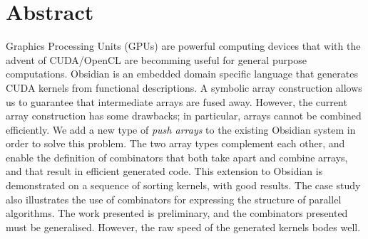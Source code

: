 

\section*{Abstract}
Graphics Processing Units (GPUs) are powerful computing devices 
that with the advent of CUDA/OpenCL are becomming useful for general 
purpose computations. 
Obsidian is an embedded domain specific language that generates CUDA kernels
from functional descriptions.
A symbolic array construction allows us to guarantee that intermediate
arrays are fused away. However, the current array construction has
some drawbacks; in particular, arrays cannot be combined efficiently.
We add a new type of {\em push arrays} to the existing Obsidian system in 
order to solve this problem. The two array types complement each other,
and enable the definition of combinators that both
take apart and combine arrays, and that result in efficient generated code.
This extension to Obsidian is demonstrated on a sequence of
sorting kernels, with good results.
The case study also illustrates the use of combinators for expressing
the structure of parallel algorithms.
The work presented is preliminary, and 
the combinators presented must be generalised.
However, the raw speed of the generated kernels bodes well.
